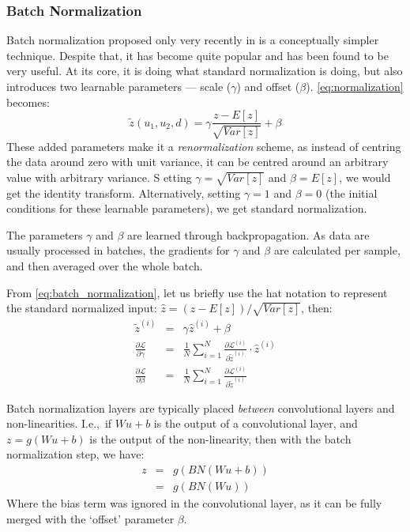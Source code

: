 \subsubsection{Batch Normalization}
      Batch normalization proposed only very recently in
      \citep{ioffe_batch_2015} is a conceptually simpler technique. Despite
      that, it has become quite popular and has been found to be very useful.
      At its core, it is doing what standard normalization is doing, but also
      introduces two learnable parameters --- scale ($\gamma$) and offset
      ($\beta$).
      \autoref{eq:normalization} becomes:
      \begin{equation}
        \tilde{z}(u_1,u_2,d) = \gamma\frac{z-E[z]}{\sqrt{Var[z]}} + \beta 
				\label{eq:batch_normalization}
      \end{equation}
      These added parameters make it a \emph{renormalization} scheme, as instead of
      centring the data around zero with unit variance, it can be centred
      around an arbitrary value with arbitrary variance. S etting
      $\gamma = \sqrt{Var[z]}$ and $\beta = E[z]$, we would get the identity
      transform. Alternatively, setting $\gamma = 1$ and $\beta = 0$ (the
      initial conditions for these learnable parameters), we get standard
      normalization.
      
      The parameters $\gamma$ and $\beta$ are learned through backpropagation.
      As data are usually processed in batches, the gradients for $\gamma$ and
      $\beta$ are calculated per sample, and then averaged over the whole
      batch.

      From \autoref{eq:batch_normalization}, let us briefly use the hat
      notation to represent the standard normalized input:
      $\hat{z} = (z-E[z])/\sqrt{Var[z]}$, then:
      \begin{eqnarray}
        \tilde{z}^{(i)} & = & \gamma \hat{z}^{(i)} + \beta \nonumber\\
        \frac{\partial \mathcal{L}}{\partial \gamma}& =&
        \frac{1}{N}\sum_{i=1}^{N} \frac{\partial
        \mathcal{L}^{(i)}}{\partial \tilde{z}^{(i)}} \cdot \hat{z}^{(i)} \\
        \frac{\partial \mathcal{L}}{\partial \beta}& =&
        \frac{1}{N}\sum_{i=1}^{N} \frac{\partial
        \mathcal{L}^{(i)}}{\partial \tilde{z}^{(i)}} 
      \end{eqnarray}

      Batch normalization layers are typically placed \emph{between} convolutional layers
      and non-linearities. I.e.,\ if $Wu+b$ is the output of a convolutional
      layer, and $z=g(Wu+b)$ is the output of the non-linearity, then with the
      batch normalization step, we have:
      \begin{eqnarray}
        z &=& g(BN(Wu+b)) \nonumber\\
          &=& g(BN(Wu))
      \end{eqnarray}
      Where the bias term was ignored in the convolutional layer, as it can be
      fully merged with the `offset' parameter $\beta$.

